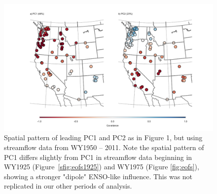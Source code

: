 \documentclass[final, double]{ua-thesis}
\begin{document}
\begin{figure}[ht]
\centering
\centerline{\includegraphics[width=190mm]{p1figures/s2.pdf}}
\caption{Spatial pattern of leading PC1 and PC2 as in Figure 1, but using streamflow data from WY1950 – 2011. Note the spatial pattern of PC1 differs slightly from PC1 in streamflow data beginning in WY1925 (Figure~\ref{sfig:eofs1925}) and WY1975 (Figure \ref{fig:eofs}), showing a stronger "dipole" ENSO-like influence. This was not replicated in our other periods of analysis.}
\label{sfig:eofs1950}
\end{figure}
\end{document}
